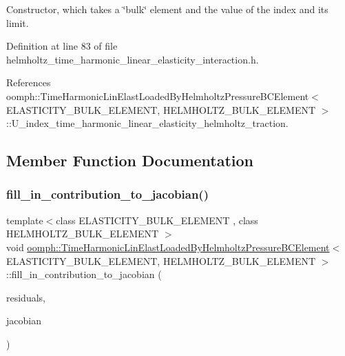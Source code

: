 Constructor, which takes a \char`\"{}bulk\char`\"{} element and the value of the index and its limit. 



Definition at line 83 of file helmholtz\+\_\+time\+\_\+harmonic\+\_\+linear\+\_\+elasticity\+\_\+interaction.\+h.



References oomph\+::\+Time\+Harmonic\+Lin\+Elast\+Loaded\+By\+Helmholtz\+Pressure\+B\+C\+Element$<$ E\+L\+A\+S\+T\+I\+C\+I\+T\+Y\+\_\+\+B\+U\+L\+K\+\_\+\+E\+L\+E\+M\+E\+N\+T, H\+E\+L\+M\+H\+O\+L\+T\+Z\+\_\+\+B\+U\+L\+K\+\_\+\+E\+L\+E\+M\+E\+N\+T $>$\+::\+U\+\_\+index\+\_\+time\+\_\+harmonic\+\_\+linear\+\_\+elasticity\+\_\+helmholtz\+\_\+traction.



\subsection{Member Function Documentation}
\mbox{\label{classoomph_1_1TimeHarmonicLinElastLoadedByHelmholtzPressureBCElement_a151fa0b3aa8df4a582d62d82ae42f40e}} 
\subsubsection{\texorpdfstring{fill\+\_\+in\+\_\+contribution\+\_\+to\+\_\+jacobian()}{fill\_in\_contribution\_to\_jacobian()}}
{\footnotesize\ttfamily template$<$class E\+L\+A\+S\+T\+I\+C\+I\+T\+Y\+\_\+\+B\+U\+L\+K\+\_\+\+E\+L\+E\+M\+E\+NT , class H\+E\+L\+M\+H\+O\+L\+T\+Z\+\_\+\+B\+U\+L\+K\+\_\+\+E\+L\+E\+M\+E\+NT $>$ \\
void \hyperlink{classoomph_1_1TimeHarmonicLinElastLoadedByHelmholtzPressureBCElement}{oomph\+::\+Time\+Harmonic\+Lin\+Elast\+Loaded\+By\+Helmholtz\+Pressure\+B\+C\+Element}$<$ E\+L\+A\+S\+T\+I\+C\+I\+T\+Y\+\_\+\+B\+U\+L\+K\+\_\+\+E\+L\+E\+M\+E\+NT, H\+E\+L\+M\+H\+O\+L\+T\+Z\+\_\+\+B\+U\+L\+K\+\_\+\+E\+L\+E\+M\+E\+NT $>$\+::fill\+\_\+in\+\_\+contribution\+\_\+to\+\_\+jacobian (\begin{DoxyParamCaption}\item[{Vector$<$ double $>$ \&}]{residuals,  }\item[{Dense\+Matrix$<$ double $>$ \&}]{jacobian }\end{DoxyParamCaption})\hspace{0.3cm}{\ttfamily [inline]}}



